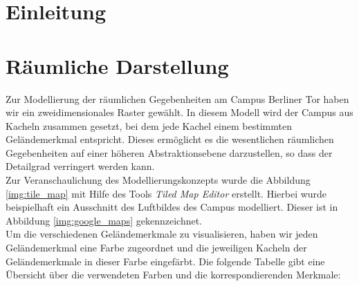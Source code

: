 \documentclass[10pt]{scrartcl}
\author{André Harms, Oliver Steenbuck, Armin Steudte  \\ Carsten Noetzel, Dennis Blauhut, Torben Becker}
\title{\titletext}
\date{26.10.2011}
\begin{document}
\maketitle

\setcounter{tocdepth}{3}
\tableofcontents

	\listoftables                                 												%
	\listoffigures   

\section{Einleitung}

\section{Räumliche Darstellung}
Zur Modellierung der räumlichen Gegebenheiten am Campus Berliner Tor haben wir ein zweidimensionales Raster gewählt.
In diesem Modell wird der Campus aus Kacheln zusammen gesetzt, bei dem jede Kachel einem bestimmten Geländemerkmal entspricht.
Dieses ermöglicht es die wesentlichen räumlichen Gegebenheiten auf einer höheren Abstraktionsebene darzustellen, so dass der Detailgrad verringert werden kann.\\
Zur Veranschaulichung des Modellierungskonzepts wurde die Abbildung \ref{img:tile_map} mit Hilfe des Tools \textit{Tiled Map Editor} erstellt. Hierbei wurde beispielhaft ein Ausschnitt des Luftbildes des Campus modelliert.
Dieser ist in Abbildung \ref{img:google_maps} gekennzeichnet.\\
Um die verschiedenen Geländemerkmale zu visualisieren, haben wir jeden Geländemerkmal eine Farbe zugeordnet und die jeweiligen Kacheln der Geländemerkmale in dieser Farbe eingefärbt. Die folgende Tabelle gibt eine Übersicht über die verwendeten Farben und die korrespondierenden Merkmale:

\end{document}
